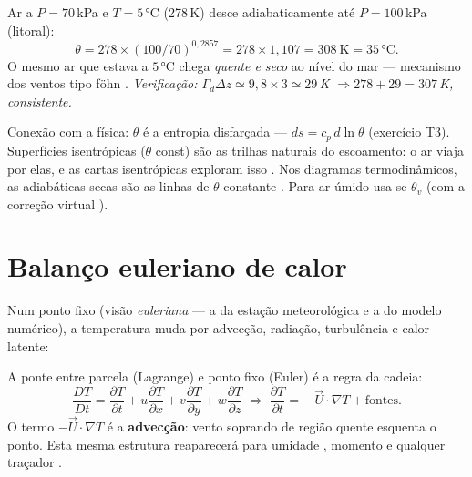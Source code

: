 \documentclass[11pt]{article}
\begin{document}
\begin{exemplo}
Ar a $P = 70$\,kPa e $T = 5\,°$C (278\,K) desce adiabaticamente até
$P = 100$\,kPa (litoral):
\[ \theta = 278\times(100/70)^{0{,}2857} = 278\times1{,}107 = 308\ \mathrm{K}
 = 35\,°\mathrm{C}. \]
O mesmo ar que estava a $5\,°$C chega \emph{quente e seco} ao nível do
mar — mecanismo dos ventos tipo föhn .
\emph{Verificação: $\Gamma_d\Delta z \simeq 9{,}8\times3 \simeq 29$\,K
$\Rightarrow 278+29=307$\,K, consistente.}
\end{exemplo}

Conexão com a física: $\theta$ é a entropia disfarçada —
$ds = c_p\,d\ln\theta$ (exercício T3). Superfícies isentrópicas
($\theta$ const) são as trilhas naturais do escoamento: o ar viaja por
elas, e as cartas isentrópicas exploram isso . Nos diagramas termodinâmicos, as adiabáticas secas são as
linhas de $\theta$ constante . Para
ar úmido usa-se $\theta_v$ (com a correção virtual ).

\section{Balanço euleriano de calor}\label{sec:euler}


Num ponto fixo (visão \emph{euleriana} — a da estação meteorológica e a
do modelo numérico), a temperatura muda por advecção, radiação,
turbulência e calor latente:

\begin{formadif}
A ponte entre parcela (Lagrange) e ponto fixo (Euler) é a regra da cadeia:
\[ \frac{DT}{Dt} = \frac{\partial T}{\partial t}
 + u\frac{\partial T}{\partial x} + v\frac{\partial T}{\partial y}
 + w\frac{\partial T}{\partial z}
\;\Longrightarrow\;
\frac{\partial T}{\partial t} = -\,\vec{U}\cdot\nabla T + \text{fontes}. \]
O termo $-\vec U\cdot\nabla T$ é a \textbf{advecção}: vento soprando de
região quente esquenta o ponto. Esta mesma estrutura reaparecerá para
umidade , momento  e qualquer traçador .
\end{formadif}
\end{document}

